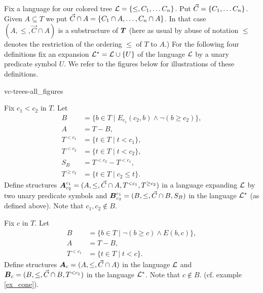 Fix a language for our colored tree $\mathcal L = \{\leq, C_1, \ldots C_n\}$. Put  $\vec C = \left\{C_1, \ldots C_n\right\}$.
Given $A \subseteq T$ we put $\vec C \cap A = \left\{C_1 \cap A, \ldots, C_n \cap A\right\}$.
In that case $(A, \leq, \vec C \cap A)$ is a substructure of $\operatorname{\boldsymbol T}$ (here as usual by abuse of notation $\leq$ denotes the restriction of the ordering $\leq$ of $T$ to $A$.)
For the following four definitions fix an expansion $\mathcal L^* = \mathcal L \cup \{U\}$ of the language $\mathcal L$ by a unary predicate symbol $U$.
We refer to the figures below for illustrations of these definitions.

 {vc-trees-all_figures}

\begin{Definition}
  Fix $c_1 < c_2$ in $T$. Let
  \begin{align*}
    B &= \{b \in T \mid E_{c_1}(c_2, b) \wedge \neg(b \geq c_2)\}, \\
    A &= T - B, \\
    T^{<c_1} &= \{t \in T \mid t < c_1\}, \\
    T^{<c_2} &= \{t \in T \mid t < c_2\}, \\
    S_B &= T^{<c_2} - T^{<c_1}, \\
    T^{\geq c_2} &= \{t \in T \mid c_2 \leq t\}.
  \end{align*}
  Define structures $\operatorname{\boldsymbol A}^{c_1}_{c_2} = (A, \leq, \vec C \cap A, T^{<c_1}, T^{\geq c_2})$ in a language expanding $\mathcal L$ by two unary predicate symbols and
  $\operatorname{\boldsymbol B}^{c_1}_{c_2} = (B, \leq, \vec C \cap B, S_B)$ in the language $\mathcal L^*$ (as defined above).
  Note that $c_1, c_2 \notin B$.
\end{Definition}


\begin{Definition}
  Fix $c$ in $T$. Let
  \begin{align*}
    B &= \{b \in T \mid \neg(b \geq c) \wedge E(b,c)\}, \\
    A &= T - B, \\
    T^{<c_1} &= \{t \in T \mid t < c\}.
  \end{align*}
  Define structures $\operatorname{\boldsymbol A}_{c} = (A, \leq, \vec C \cap A)$ in the language $\mathcal L$ and $\operatorname{\boldsymbol B}_{c} = (B, \leq, \vec C\cap B, T^{<c_1})$ in the language $\mathcal L^*$.
  Note that $c \notin B$. (cf. example \ref{ex_cone}).
\end{Definition}

